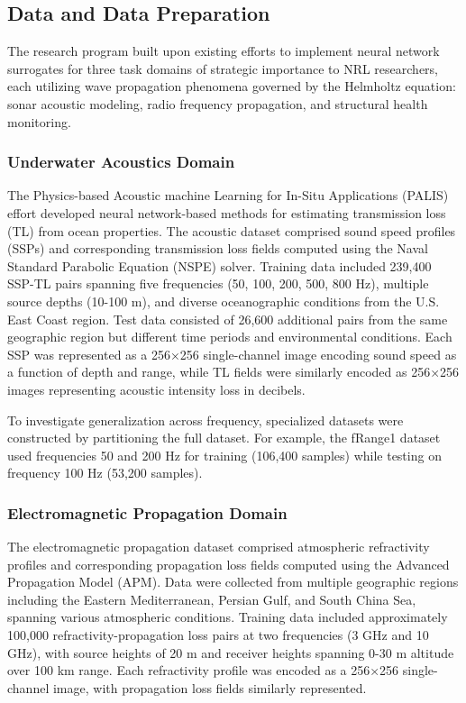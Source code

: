 \documentclass{article}
\begin{document}
\subsection{Data and Data Preparation}

The research program built upon existing efforts to implement neural network surrogates for three task domains of strategic importance to NRL researchers, each utilizing wave propagation phenomena governed by the Helmholtz equation: sonar acoustic modeling, radio frequency propagation, and structural health monitoring.

\subsubsection{Underwater Acoustics Domain}

The Physics-based Acoustic machine Learning for In-Situ Applications (PALIS) effort developed neural network-based methods for estimating transmission loss (TL) from ocean properties. The acoustic dataset comprised sound speed profiles (SSPs) and corresponding transmission loss fields computed using the Naval Standard Parabolic Equation (NSPE) solver. Training data included 239,400 SSP-TL pairs spanning five frequencies (50, 100, 200, 500, 800 Hz), multiple source depths (10-100 m), and diverse oceanographic conditions from the U.S. East Coast region. Test data consisted of 26,600 additional pairs from the same geographic region but different time periods and environmental conditions. Each SSP was represented as a 256×256 single-channel image encoding sound speed as a function of depth and range, while TL fields were similarly encoded as 256×256 images representing acoustic intensity loss in decibels.

To investigate generalization across frequency, specialized datasets were constructed by partitioning the full dataset. For example, the fRange1 dataset used frequencies 50 and 200 Hz for training (106,400 samples) while testing on frequency 100 Hz (53,200 samples).

\subsubsection{Electromagnetic Propagation Domain}

The electromagnetic propagation dataset comprised atmospheric refractivity profiles and corresponding propagation loss fields computed using the Advanced Propagation Model (APM). Data were collected from multiple geographic regions including the Eastern Mediterranean, Persian Gulf, and South China Sea, spanning various atmospheric conditions. Training data included approximately 100,000 refractivity-propagation loss pairs at two frequencies (3 GHz and 10 GHz), with source heights of 20 m and receiver heights spanning 0-30 m altitude over 100 km range. Each refractivity profile was encoded as a 256×256 single-channel image, with propagation loss fields similarly represented.
\end{document}

